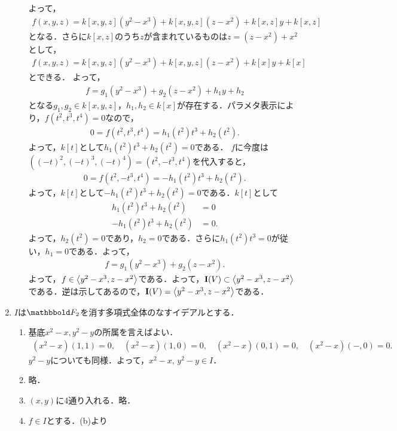 \documentclass[9pt]{ltjsarticle}
\begin{document}
\begin{enumerate}[label=(問題\arabic*)]
\begin{enumerate}[label=(\alph*)]
よって，
\begin{align}
 f(x,y,z) = k[x,y,z](y^2-x^3) + k[x,y,z](z-x^2) + k[x,z]y + k[x,z]
\end{align}
となる．さらに$k[x,z]$のうち$z$が含まれているものは$z=(z-x^2)+x^2$として，
\begin{align}
 f(x,y,z) = k[x,y,z](y^2-x^3) + k[x,y,z](z-x^2) + k[x]y + k[x]
\end{align}
とできる．
よって，
\begin{align}
 f = g_1(y^2-x^3) + g_2(z-x^2) + h_1 y + h_2
\end{align}
となる$g_1,g_2\in k[x,y,z]$，$h_1,h_2 \in k[x]$が存在する．パラメタ表示により，$f(t^2,t^3,t^4)=0$なので，
\begin{align}
0 = f(t^2,t^3,t^4) = h_1(t^2) t^3 + h_2(t^2).
\end{align}
よって，$k[t]$として$h_1(t^2)t^3 + h_2(t^2)=0$である．
$f$に今度は$((-t)^2,(-t)^3,(-t)^4)=(t^2,-t^3,t^4)$を代入すると，
\begin{align}
 0=f(t^2,-t^3,t^4) = -h_1(t^2)t^3 + h_2(t^2).
\end{align}
よって，$k[t]$として$-h_1(t^2)t^3 + h_2(t^2)=0$である．$k[t]$として
\begin{align}
 h_1(t^2)t^3 + h_2(t^2) &= 0\\
 -h_1(t^2)t^3 + h_2(t^2)& =0.
\end{align}
よって，$h_2(t^2)=0$であり，$h_2 = 0$である．さらに$h_1(t^2)t^3=0$が従い，$h_1=0$である．よって，
\begin{align}
 f = g_1(y^2-x^3) + g_2(z-x^2).
\end{align}
よって，$f\in \left\langle y^2-x^3,z-x^2 \right\rangle$である．よって，$\textbf I(V)\subset \left\langle y^2-x^3,z-x^2 \right\rangle$である．逆は示してあるので，$\textbf I(V)=\left\langle y^2-x^3,z-x^2 \right\rangle$である．
\end{enumerate}
 \item $I$は$\F_2$を消す多項式全体のなすイデアルとする．
\begin{enumerate}[label=(\alph*)]
 \item 基底$x^2-x,y^2-y$の所属を言えばよい．
\begin{align}
 (x^2-x)(1,1) = 0,\quad (x^2-x)(1,0) = 0,\quad (x^2-x)(0,1) = 0,\quad (x^2-x)(-,0) = 0.
\end{align}
$y^2-y$についても同様．よって，$x^2-x,\,y^2-y \in I$．
 \item 略．
 \item $(x,y)$に4通り入れる．略．
 \item $f\in I$とする．(b)より
\begin{align}

\end{align}
\end{enumerate}
\end{enumerate}
\end{document}
